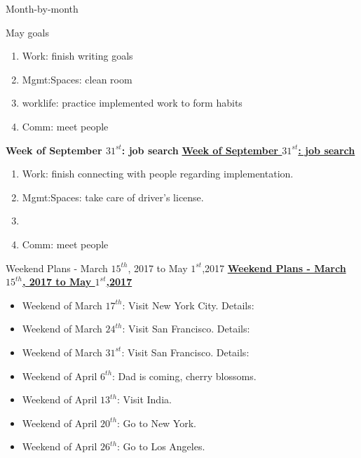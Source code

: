 \begin{multicols}{4}
\begin{columns}
\begin{column}{0.5\columnwidth}
\begin{block}{Month-by-month}
\begin{itemize}
\begin{block}{May goals}
\begin{enumerate}
\item \small Work: finish writing goals
  \small \item \small Mgmt:Spaces: clean room
\item \small worklife: practice implemented work to form habits
\item \small Comm: meet people
\end{enumerate}

\ifdefined\POSTER
\end{block}
\fi

\ifdefined\POSTER
\begin{block}{\small \bf Week of September $31^{st}$: job search}
\else
\underline{\bf Week of September $31^{st}$: job search}\\
\fi

\begin{enumerate}
\tiny \item \tiny Work: finish connecting with people regarding implementation.
\item \tiny Mgmt:Spaces: take care of driver's license.
\item \tiny
\item \tiny Comm: meet people
\end{enumerate}

\ifdefined\POSTER
\end{block}
\fi

\ifdefined\POSTER
\begin{block}{Weekend Plans - March $15^{th}$, 2017 to May $1^{st}$,2017}
\else
{\underline{\bf Weekend Plans - March $15^{th}$, 2017 to May $1^{st}$,2017}}\\
\fi
\begin{itemize}
\item \tiny Weekend of March $17^{th}$: Visit New York City. Details:
\item \tiny Weekend of March $24^{th}$: Visit San Francisco. Details:
\item \tiny Weekend of March $31^{st}$: Visit San Francisco. Details:
\item \tiny Weekend of April $6^{th}$:  Dad is coming, cherry
  blossoms.
\item \tiny Weekend of April $13^{th}$: Visit India.
\item \tiny Weekend of April $20^{th}$: Go to New York.
\item \tiny Weekend of April $26^{th}$: Go to Los Angeles.
\end{itemize}


\end{block}
\end{itemize}
\end{block}
\end{column}
\end{columns}
\end{multicols}
